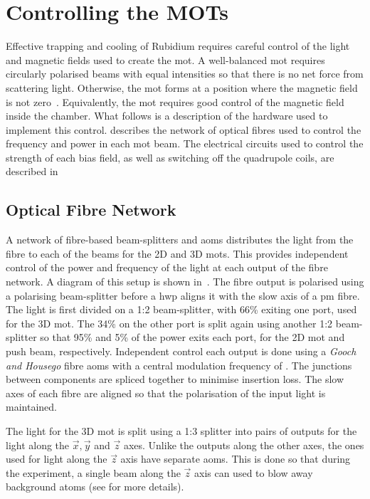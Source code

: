 \section{Controlling the MOTs}\label{sec:mot_control} Effective
trapping and cooling of Rubidium requires careful control of the light
and magnetic fields used to create the \ac{mot}. A well-balanced
\ac{mot} requires circularly polarised beams with equal intensities so
that there is no net force from scattering light. Otherwise, the
\ac{mot} forms at a position where the magnetic field is not
zero~\cite{Steane1992}. Equivalently, the \ac{mot} requires good
control of the magnetic field inside the chamber. What follows is a
description of the hardware used to implement this control.
 describes the network of optical
fibres used to control the frequency and power in each \ac{mot} beam.
The electrical circuits used to control the strength of each bias
field, as well as switching off the quadrupole coils, are described
in~ 
\subsection{Optical Fibre
Network}\label{subsec:optical_fibre} A network of fibre-based
beam-splitters and \acp{aom} distributes the light from the \Muquans
fibre to each of the beams for the 2D and 3D \acp{mot}. This provides
independent control of the power and frequency of the light at each
output of the fibre network. A diagram of this setup is shown
in~. The \Muquans fibre output is
polarised using a polarising beam-splitter before a \ac{hwp} aligns it
with the slow axis of a \ac{pm} fibre. The light is first divided on a
1:2 beam-splitter, with 66\% exiting one port, used for the 3D
\ac{mot}. The 34\% on the other port is split again using another 1:2
beam-splitter so that 95\% and 5\% of the power exits each port, for
the 2D \ac{mot} and push beam, respectively. Independent control each
output is done using a \textit{Gooch and Housego} fibre \acp{aom} with
a central modulation frequency of . The
junctions between components are spliced together to minimise
insertion loss. The slow axes of each fibre are aligned so that the
polarisation of the input light is maintained. \par\noindent The light
for the 3D \ac{mot} is split using a 1:3 splitter into pairs of
outputs for the light along the \(\vec{x},\vec{y}\) and \(\vec{z}\)
axes. Unlike the outputs along the other axes, the ones used for light
along the \(\vec{z}\) axis have separate \acp{aom}. This is done so
that during the experiment, a single beam along the \(\vec{z}\) axis
can used to blow away background atoms (see
 for more details).

